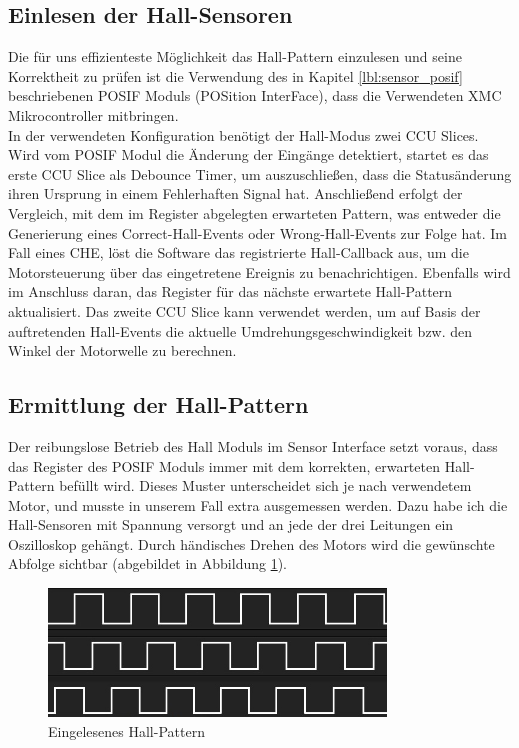 \subsection{Einlesen der Hall-Sensoren}
Die für uns effizienteste Möglichkeit das Hall-Pattern einzulesen und seine Korrektheit zu prüfen ist die Verwendung des in Kapitel \ref{lbl:sensor_posif} beschriebenen POSIF Moduls (POSition InterFace), dass die Verwendeten XMC Mikrocontroller mitbringen.\\

\noindent
In der verwendeten Konfiguration benötigt der Hall-Modus zwei CCU Slices. Wird vom POSIF Modul die Änderung der Eingänge detektiert, startet es das erste CCU Slice als Debounce Timer, um auszuschließen, dass die Statusänderung ihren Ursprung in einem Fehlerhaften Signal hat. Anschließend erfolgt der Vergleich, mit dem im Register abgelegten erwarteten Pattern, was entweder die Generierung eines Correct-Hall-Events oder Wrong-Hall-Events zur Folge hat. Im Fall eines CHE, löst die Software das registrierte Hall-Callback aus, um die Motorsteuerung über das eingetretene Ereignis zu benachrichtigen. Ebenfalls wird im Anschluss daran, das Register für das nächste erwartete Hall-Pattern aktualisiert. Das zweite CCU Slice kann verwendet werden, um auf Basis der auftretenden Hall-Events die aktuelle Umdrehungsgeschwindigkeit bzw. den Winkel der Motorwelle zu berechnen.

\subsection{Ermittlung der Hall-Pattern}
Der reibungslose Betrieb des Hall Moduls im Sensor Interface setzt voraus, dass das Register des POSIF Moduls immer mit dem korrekten, erwarteten Hall-Pattern befüllt wird. Dieses Muster unterscheidet sich je nach verwendetem Motor, und musste in unserem Fall extra ausgemessen werden. Dazu habe ich die Hall-Sensoren mit Spannung versorgt und an jede der drei Leitungen ein Oszilloskop gehängt. Durch händisches Drehen des Motors wird die gewünschte Abfolge sichtbar (abgebildet in Abbildung \ref{img:hall_pattern}).

\begin{figure}[ht]
\centering
\includegraphics[width=0.8\textwidth]{sensor/hall_pattern.jpg}
\caption{Eingelesenes Hall-Pattern}
\label{img:hall_pattern}
\end{figure}

